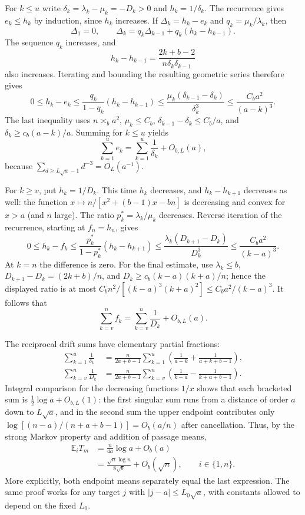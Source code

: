 For $k\leq u$ write $\delta_k=\lambda_k-\mu_k=-D_k>0$ and
$h_k=1/\delta_k$. The recurrence gives $e_k\leq h_k$ by induction, since
$h_k$ increases. If $\Delta_k=h_k-e_k$ and
$q_k=\mu_k/\lambda_k$, then
\[
 \Delta_1=0,\qquad
 \Delta_k=q_k\Delta_{k-1}+q_k(h_k-h_{k-1}).
\]
The sequence $q_k$ increases, and
\[
 h_k-h_{k-1}
 =\frac{2k+b-2}{n\delta_k\delta_{k-1}}
\]
also increases. Iterating and bounding the resulting geometric series
therefore gives
\[
 0\leq h_k-e_k
 \leq\frac{q_k}{1-q_k}(h_k-h_{k-1})
 \leq\frac{\mu_k(\delta_{k-1}-\delta_k)}{\delta_k^3}
 \leq\frac{C_ba^2}{(a-k)^3}.
\]
The last inequality uses $n\asymp_ba^2$, $\mu_k\leq C_b$,
$\delta_{k-1}-\delta_k\leq C_b/a$, and
$\delta_k\geq c_b(a-k)/a$. Summing for $k\leq u$ yields
\[
 \sum_{k=1}^{u}e_k
 =\sum_{k=1}^{u}\frac1{\delta_k}+O_{b,L}(a),
\]
because $\sum_{d\geq L\sqrt a-1}d^{-3}=O_L(a^{-1})$.

For $k\geq v$, put $h_k=1/D_k$. This time $h_k$ decreases, and
$h_k-h_{k+1}$ decreases as well: the function
$x\mapsto n/[x^2+(b-1)x-bn]$ is decreasing and convex for $x>a$
(and $n$ large). The ratio $p_k^*=\lambda_k/\mu_k$ decreases. Reverse
iteration of the recurrence, starting at $f_n=h_n$, gives
\[
 0\leq h_k-f_k
 \leq\frac{p_k^*}{1-p_k^*}(h_k-h_{k+1})
 \leq\frac{\lambda_k(D_{k+1}-D_k)}{D_k^3}
 \leq\frac{C_ba^2}{(k-a)^3}.
\]
At $k=n$ the difference is zero. For the final estimate, use
$\lambda_k\leq b$, $D_{k+1}-D_k=(2k+b)/n$, and
$D_k\geq c_b(k-a)(k+a)/n$; hence the displayed ratio is at most
$C_bn^2/[(k-a)^3(k+a)^2]\leq C_ba^2/(k-a)^3$.
It follows that
\[
 \sum_{k=v}^{n}f_k
 =\sum_{k=v}^{n}\frac1{D_k}+O_{b,L}(a).
\]

The reciprocal drift sums have elementary partial fractions:
\begin{align*}
 \sum_{k=1}^{u}\frac1{\delta_k}
 &=\frac n{2a+b-1}
   \sum_{k=1}^{u}\left(\frac1{a-k}+\frac1{a+k+b-1}\right),\\
 \sum_{k=v}^{n}\frac1{D_k}
 &=\frac n{2a+b-1}
   \sum_{k=v}^{n}\left(\frac1{k-a}-\frac1{k+a+b-1}\right).
\end{align*}
Integral comparison for the decreasing functions $1/x$ shows that each
bracketed sum is
$\tfrac12\log a+O_{b,L}(1)$: the first singular sum runs from a distance
of order $a$ down to $L\sqrt a$, and in the second sum the upper endpoint
contributes only
$\log[(n-a)/(n+a+b-1)]=O_b(a/n)$ after cancellation.
Thus, by the strong Markov property and addition of passage means,
\[
 \boxed{\begin{aligned}
 \mathbb E_iT_m
 &=\frac n{4a}\log a+O_b(a)\\
 &=\frac{\sqrt n\log n}{8\sqrt b}+O_b(\sqrt n),
 \qquad i\in\{1,n\}.
 \end{aligned}}
\]
More explicitly, both endpoint means separately equal the last expression.
The same proof works for any target $j$ with $|j-a|\leq L_0\sqrt a$,
with constants allowed to depend on the fixed $L_0$.


